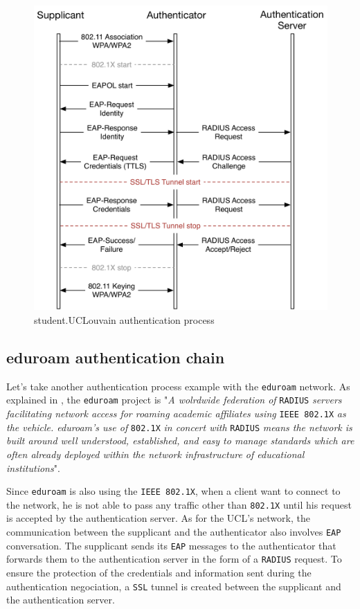 \begin{figure}[H]
	\includegraphics[width=.9\linewidth]{Pictures/Chapter2/student.png}
	\caption{student.UCLouvain authentication process}
\end{figure}


\subsection{eduroam authentication chain}
Let's take another authentication process example with the \texttt{eduroam} network.
As explained in \cite{eduoramRadius}, the \texttt{eduroam} project is "\textit{A wolrdwide federation of} \texttt{RADIUS} \textit{ servers facilitating network access for roaming academic affiliates using} \texttt{IEEE 802.1X} \textit{as the vehicle. eduroam's use of} \texttt{802.1X} \textit{in concert with} \texttt{RADIUS} \textit{means the network is built around well understood, established, and easy to manage standards which are often already deployed within the network infrastructure of educational institutions}".

Since \texttt{eduroam} is also using the \texttt{IEEE 802.1X}, when a client want to connect to the network, he is not able to pass any traffic other than \texttt{802.1X} until his request is accepted by the authentication server. As for the UCL's network, the communication between the supplicant and the authenticator also involves \texttt{EAP} conversation. The supplicant sends its \texttt{EAP} messages to the authenticator that forwards them to the authentication server in the form of a \texttt{RADIUS} request. To ensure the protection of the credentials and information sent during the authentication negociation, a \texttt{SSL} tunnel is created between the supplicant and the authentication server.

